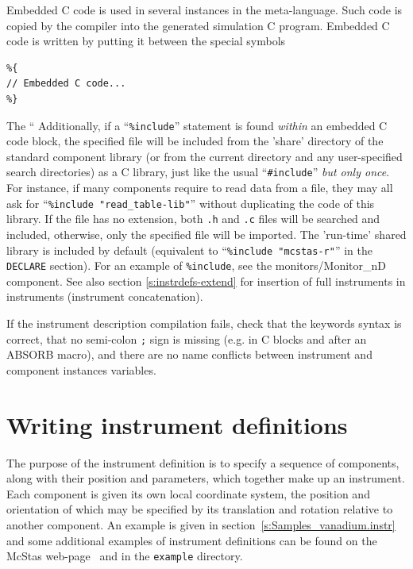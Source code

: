 Embedded C code is used in several instances in the \MCS
meta-language. Such code is copied by the \MCS compiler into the
generated simulation C program. Embedded C code is written by putting it
between the special symbols %
\begin{lstlisting}
%{ 
// Embedded C code...
%}
\end{lstlisting} 
The ``%
Additionally, if a ``\verb+%include+'' statement is found \emph{within} an embedded C code block, the specified file will be included from the 'share' directory of the standard component library  (or from the
current directory and any user-specified search directories) as a C library, just like the usual ``\verb+#include+'' \emph{but only once}. For instance, if many components require to read data from a file, they may all ask for ``\verb+%include "read_table-lib"+''  without duplicating the code of this library. If the file has no extension, both \verb+.h+ and \verb+.c+ files will be searched and included, otherwise, only the specified file will be imported. The \MCS 'run-time' shared
library is included by default (equivalent to ``\verb+%include "mcstas-r"+'' in the \texttt{DECLARE} section). 
For an
example of \texttt{\%include}, see the monitors/Monitor\_nD component. See also section \ref{s:instrdefs-extend} for insertion of full instruments in instruments (instrument concatenation).

If the instrument description compilation fails, check that the
keywords syntax is correct, that no semi-colon \verb+;+ sign is
missing (e.g. in C blocks and after an ABSORB macro),
and there are no name conflicts between instrument and component instances variables.


\section{Writing instrument definitions}
\label{s:instrdefs}

The purpose of the instrument definition is to specify a sequence of
components, along with their position and parameters, which together
make up an instrument. Each component is given its own local coordinate
system, the position and orientation of which may be specified by its
translation and rotation relative to another component. An example is
given in section~\ref{s:Samples_vanadium.instr} and some additional
examples of instrument definitions can be found on the McStas
web-page~\cite{mcstas_webpage} and in the \texttt{example} directory.


